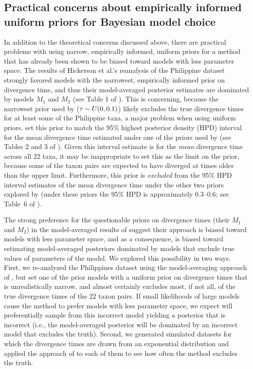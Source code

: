 \subsection*{Practical concerns about empirically informed uniform priors for
    Bayesian model choice}
In addition to the theoretical concerns discussed above, there are practical
problems with using narrow, empirically informed, uniform priors for a method
that has already been shown to be biased toward models with less parameter
space.
The results of Hickerson et al.'s \citeyear{Hickerson2013} reanalysis of the
Philippine dataset strongly favored models with the narrowest, empirically
informed prior on divergence time, and thus their model-averaged posterior
estimates are dominated by models $M_1$ and $M_2$ (see Table 1 of
\citet{Hickerson2013}).
This is concerning, because the narrowest \divt{} prior used by
\citet{Hickerson2013} ($\tau_{} \sim U(0,0.1)$) likely excludes the true
divergence times for at least some of the Philippine taxa, a major problem when
using uniform priors.
\citet{Hickerson2013} set this prior to match the 95\% highest posterior
density (HPD) interval for the mean divergence time estimated under one of the
priors used by \citet{Oaks2012} (see Tables 2 and 3 of \citet{Oaks2012}).
Given this interval estimate is for the \emph{mean} divergence time across all
22 taxa, it may be inappropriate to set this as the limit on the prior, because
some of the taxon pairs are expected to have diverged at times older than the
upper limit.
Furthermore, this prior is \emph{excluded} from the 95\% HPD interval estimates
of the mean divergence time under the other two priors explored by
\citet{Oaks2012} (under these priors the 95\% HPD is approximately 0.3--0.6;
see Table~6 of \citet{Oaks2012}).

The strong preference for the questionable priors on divergence times (their
$M_1$ and $M_2$) in the model-averaged results of \citet{Hickerson2013} suggest
their approach is biased toward models with less parameter space, and as a
consequence, is biased toward estimating model-averaged posteriors dominated by
models that exclude true values of parameters of the model.
We explored this possibility in two ways.
First, we re-analyzed the Philippines dataset using the model-averaging
approach of \citet{Hickerson2013}, but set one of the prior models with a
uniform prior on divergence times that is unrealistically narrow, and almost
certainly excludes most, if not all, of the true divergence times of the 22
taxon pairs.
If small likelihoods of large models cause the method to prefer models with
less parameter space, we expect \msb will preferentially sample from this
incorrect model yielding a posterior that is incorrect (i.e., the
model-averaged posterior will be dominated by an incorrect model that excludes
the truth).
Second, we generated simulated datasets for which the divergence times are
drawn from an exponential distribution and applied the approach of
\citet{Hickerson2013} to each of them to see how often the method excludes the
truth.

